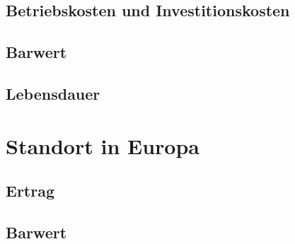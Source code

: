 \documentclass[a4paper,12pt]{article}
\begin{document}
	\subsection{Betriebskosten und Investitionskosten}
	\subsection{Barwert}
	\subsection{Lebensdauer}
	\newpage
	\section{Standort in Europa}
	\subsection{Ertrag}
	\subsection{Barwert}
	\newpage
	\listoffigures
	
\end{document}
